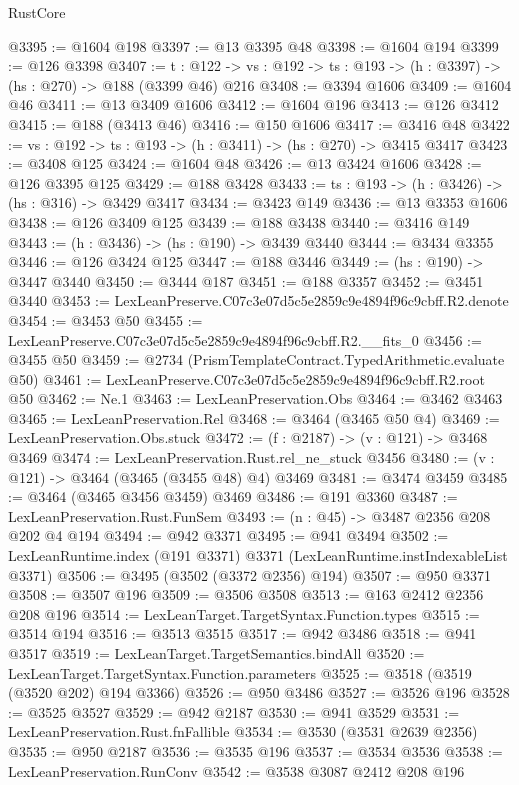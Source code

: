 \begin{lexlean}{RustCore}
\begin{coremodule}
@3395 := @1604 @198
@3397 := @13 @3395 @48
@3398 := @1604 @194
@3399 := @126 @3398
@3407 := {t : @122} ->
  {vs : @192} -> {ts : @193} -> (h : @3397) -> (hs : @270) -> @188 (@3399 @46) @216
@3408 := @3394 @1606
@3409 := @1604 @46
@3411 := @13 @3409 @1606
@3412 := @1604 @196
@3413 := @126 @3412
@3415 := @188 (@3413 @46)
@3416 := @150 @1606
@3417 := @3416 @48
@3422 := {vs : @192} -> {ts : @193} -> (h : @3411) -> (hs : @270) -> @3415 @3417
@3423 := @3408 @125
@3424 := @1604 @48
@3426 := @13 @3424 @1606
@3428 := @126 @3395 @125
@3429 := @188 @3428
@3433 := {ts : @193} -> (h : @3426) -> (hs : @316) -> @3429 @3417
@3434 := @3423 @149
@3436 := @13 @3353 @1606
@3438 := @126 @3409 @125
@3439 := @188 @3438
@3440 := @3416 @149
@3443 := (h : @3436) -> (hs : @190) -> @3439 @3440
@3444 := @3434 @3355
@3446 := @126 @3424 @125
@3447 := @188 @3446
@3449 := (hs : @190) -> @3447 @3440
@3450 := @3444 @187
@3451 := @188 @3357
@3452 := @3451 @3440
@3453 := LexLeanPreserve.C07c3e07d5c5e2859c9e4894f96c9cbff.R2.denote
@3454 := @3453 @50
@3455 := LexLeanPreserve.C07c3e07d5c5e2859c9e4894f96c9cbff.R2.__fits_0
@3456 := @3455 @50
@3459 := @2734 (PrismTemplateContract.TypedArithmetic.evaluate @50)
@3461 := LexLeanPreserve.C07c3e07d5c5e2859c9e4894f96c9cbff.R2.root @50
@3462 := Ne.{1}
@3463 := LexLeanPreservation.Obs
@3464 := @3462 @3463
@3465 := LexLeanPreservation.Rel
@3468 := @3464 (@3465 @50 @4)
@3469 := LexLeanPreservation.Obs.stuck
@3472 := (f : @2187) -> (v : @121) -> @3468 @3469
@3474 := LexLeanPreservation.Rust.rel_ne_stuck @3456
@3480 := (v : @121) -> @3464 (@3465 (@3455 @48) @4) @3469
@3481 := @3474 @3459
@3485 := @3464 (@3465 @3456 @3459) @3469
@3486 := @191 @3360
@3487 := LexLeanPreservation.Rust.FunSem
@3493 := (n : @45) -> @3487 @2356 @208 @202 @4 @194
@3494 := @942 @3371
@3495 := @941 @3494
@3502 := LexLeanRuntime.index (@191 @3371) @3371 (LexLeanRuntime.instIndexableList @3371)
@3506 := @3495 (@3502 (@3372 @2356) @194)
@3507 := @950 @3371
@3508 := @3507 @196
@3509 := @3506 @3508
@3513 := @163 @2412 @2356 @208 @196
@3514 := LexLeanTarget.TargetSyntax.Function.types
@3515 := @3514 @194
@3516 := @3513 @3515
@3517 := @942 @3486
@3518 := @941 @3517
@3519 := LexLeanTarget.TargetSemantics.bindAll
@3520 := LexLeanTarget.TargetSyntax.Function.parameters
@3525 := @3518 (@3519 (@3520 @202) @194 @3366)
@3526 := @950 @3486
@3527 := @3526 @196
@3528 := @3525 @3527
@3529 := @942 @2187
@3530 := @941 @3529
@3531 := LexLeanPreservation.Rust.fnFallible
@3534 := @3530 (@3531 @2639 @2356)
@3535 := @950 @2187
@3536 := @3535 @196
@3537 := @3534 @3536
@3538 := LexLeanPreservation.RunConv
@3542 := @3538 @3087 @2412 @208 @196

\end{coremodule}
\end{lexlean}
